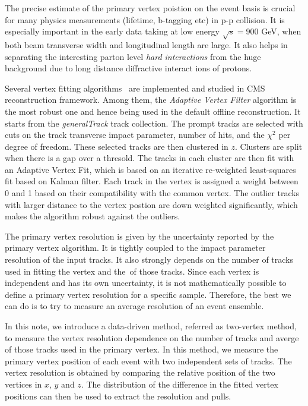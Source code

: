 
The precise estimate of the primary vertex poistion on the event basis 
is crucial for many physics measurements (lifetime, b-tagging etc) 
in p-p collision. 
It is especially important in the early data taking at 
low energy $\sqrt{s}=900$ GeV, when both beam transverse width 
and longitudinal length are large. 
It also helps in separating the interesting parton level 
\emph{hard interactions} from the huge background due to 
long distance diffractive interact ions of protons. 


Several vertex fitting algorithms~\cite{pvtxreco} are implemented 
and studied in CMS reconstruction framework. 
Among them, the \emph{Adaptive Vertex Filter} algorithm is the most robust one and hence being used in the default offline reconstruction. 
It starts from the \emph{generalTrack} track collection. 
The prompt tracks are selected with cuts on the track transverse 
impact parameter, number of hits, and the $\chi^2$ per degree of freedom. 
These selected tracks are then clustered in $z$. Clusters are
split when there is a gap over a thresold. The tracks in each
cluster are then fit with an Adaptive Vertex Fit, which is 
based on an iterative re-weighted least-squares fit based on Kalman filter. 
Each track in the vertex is assigned a weight between 0 and 1
based on their compatibility with the common vertex. 
The outlier tracks with larger distance to the vertex postion are 
down weighted significantly, which makes the algorithm robust against the 
outliers. 

The primary vertex resolution is given by the uncertainty 
reported by the primary vertex algorithm. 
It is tightly coupled to the impact parameter resolution of the input tracks. 
It also strongly depends on the number of tracks used in fitting the vertex 
and the \pt\,of those tracks. 
Since each vertex is independent and has its own uncertainty, it is not 
mathematically possible to define a primary vertex resolution for a specific sample.
Therefore, the best we can do is to try to measure an average 
resolution of an event ensemble.

In this note, we introduce a data-driven method, referred as two-vertex 
method, to measure the vertex resolution dependence on the 
number of tracks and averge \pt\, of those tracks used in the primary vertex. 
In this method, we measure the primary vertex position of each event 
with two independent sets of tracks. 
The vertex resolution is obtained by comparing the 
relative position of the two vertices in $x$, $y$ and $z$. 
The distribution of the difference in the fitted vertex positions 
can then be used to extract the resolution and pulls. 

